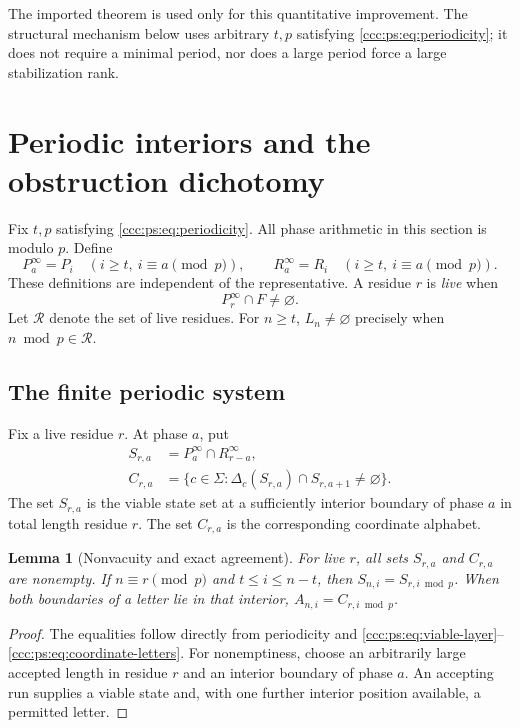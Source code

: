 \documentclass[11pt,letterpaper]{article}
\newtheorem{lemma}[theorem]{Lemma}
\theoremstyle{definition}
\theoremstyle{remark}
\newcommand{\res}{\mathcal R}
\begin{document}
The imported theorem is used only for this quantitative improvement. The
structural mechanism below uses arbitrary $t,p$ satisfying
\eqref{ccc:ps:eq:periodicity}; it does not require a minimal period, nor does a
large period force a large stabilization rank.

\section{Periodic interiors and the obstruction dichotomy}\label{ccc:ps:sec:dichotomy}

Fix $t,p$ satisfying \eqref{ccc:ps:eq:periodicity}. All phase arithmetic in this
section is modulo $p$. Define
\[
 P^\infty_a=P_i\quad(i\ge t,\ i\equiv a\pmod p),\qquad
 R^\infty_a=R_i\quad(i\ge t,\ i\equiv a\pmod p).
\]
These definitions are independent of the representative. A residue $r$ is
\emph{live} when
\begin{equation}\label{ccc:ps:eq:live}
 P^\infty_r\cap F\ne\varnothing.
\end{equation}
Let $\res$ denote the set of live residues. For $n\ge t$,
$L_n\ne\varnothing$ precisely when $n\bmod p\in\res$.

\subsection{The finite periodic system}

Fix a live residue $r$. At phase $a$, put
\begin{align}
 S_{r,a}&=P^\infty_a\cap R^\infty_{r-a},\label{ccc:ps:eq:stable-states}\\
 C_{r,a}&=\{c\in\Sigma:
             \Delta_c(S_{r,a})\cap S_{r,a+1}\ne\varnothing\}.
             \label{ccc:ps:eq:stable-letters}
\end{align}
The set $S_{r,a}$ is the viable state set at a sufficiently interior
boundary of phase $a$ in total length residue $r$. The set $C_{r,a}$ is
the corresponding coordinate alphabet.

\begin{lemma}[Nonvacuity and exact agreement]\label{ccc:ps:lem:agreement}
For live $r$, all sets $S_{r,a}$ and $C_{r,a}$ are nonempty.
If $n\equiv r\pmod p$ and $t\le i\le n-t$, then
$S_{n,i}=S_{r,i\bmod p}$. When both boundaries of a letter lie in that
interior, $A_{n,i}=C_{r,i\bmod p}$.
\end{lemma}
\begin{proof}
The equalities follow directly from periodicity and
\eqref{ccc:ps:eq:viable-layer}--\eqref{ccc:ps:eq:coordinate-letters}. For nonemptiness,
choose an arbitrarily large accepted length in residue $r$ and an
interior boundary of phase $a$. An accepting run supplies a viable state
and, with one further interior position available, a permitted letter.
\end{proof}
\end{document}
